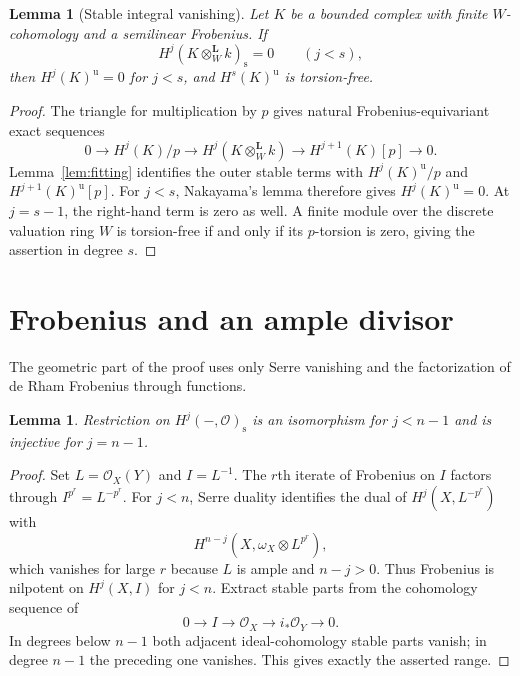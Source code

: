 \documentclass[11pt]{article}
\newtheorem{lemma}[theorem]{Lemma}
\theoremstyle{remark}\newtheorem{remark}[theorem]{Remark}
\newcommand{\OO}{\mathcal O}
\newcommand{\st}{\mathrm{s}}
\newcommand{\uF}{\mathrm{u}}
\begin{document}
\begin{lemma}[Stable integral vanishing]\label{lem:nakayama}
Let $K$ be a bounded complex with finite $W$-cohomology and a semilinear Frobenius. If
\[
 H^j(K\otimes_W^{\mathbf L}k)_{\st}=0\qquad(j<s),
\]
then $H^j(K)^{\uF}=0$ for $j<s$, and $H^s(K)^{\uF}$ is torsion-free.
\end{lemma}
\begin{proof}
The triangle for multiplication by $p$ gives natural Frobenius-equivariant exact sequences
\[
 0\longrightarrow H^j(K)/p\longrightarrow
 H^j(K\otimes_W^{\mathbf L}k)
 \longrightarrow H^{j+1}(K)[p]\longrightarrow0.
\]
Lemma~\ref{lem:fitting} identifies the outer stable terms with
$H^j(K)^{\uF}/p$ and $H^{j+1}(K)^{\uF}[p]$. For $j<s$, Nakayama's lemma therefore gives $H^j(K)^{\uF}=0$. At $j=s-1$, the right-hand term is zero as well. A finite module over the discrete valuation ring $W$ is torsion-free if and only if its $p$-torsion is zero, giving the assertion in degree $s$.
\end{proof}

\section{Frobenius and an ample divisor}

The geometric part of the proof uses only Serre vanishing and the factorization of de Rham Frobenius through functions.

\begin{lemma}\label{lem:coherent}
Restriction on $H^j(-,\OO)_{\st}$ is an isomorphism for $j<n-1$ and is injective for $j=n-1$.
\end{lemma}
\begin{proof}
Set $L=\OO_X(Y)$ and $I=L^{-1}$. The $r$th iterate of Frobenius on $I$ factors through $I^{p^r}=L^{-p^r}$. For $j<n$, Serre duality identifies the dual of $H^j(X,L^{-p^r})$ with
\[
 H^{n-j}(X,\omega_X\otimes L^{p^r}),
\]
which vanishes for large $r$ because $L$ is ample and $n-j>0$. Thus Frobenius is nilpotent on $H^j(X,I)$ for $j<n$. Extract stable parts from the cohomology sequence of
\[
 0\longrightarrow I\longrightarrow\OO_X
 \longrightarrow i_*\OO_Y\longrightarrow0.
\]
In degrees below $n-1$ both adjacent ideal-cohomology stable parts vanish; in degree $n-1$ the preceding one vanishes. This gives exactly the asserted range.
\end{proof}
\end{document}
